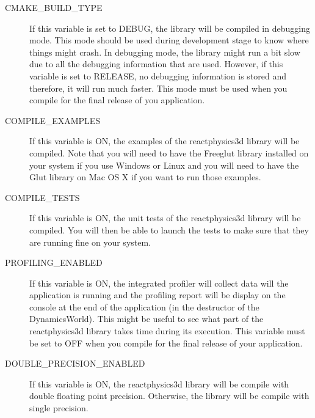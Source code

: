 \documentclass[a4paper,12pt]{article}
\begin{document}
       \begin{description}
         \item[CMAKE\_BUILD\_TYPE] If this variable is set to DEBUG, the library will be compiled in debugging mode.
                                                    This mode should be used during development stage to know where things might crash.
                                                    In debugging mode, the library might run a bit slow due to all the debugging information
                                                    that are used. However, if this variable is set to RELEASE, no debugging information is stored
                                                    and therefore, it will run much faster. This mode must be used when you compile for the final
                                                    release of you application.
                                                   
         \item[COMPILE\_EXAMPLES] If this variable is ON, the examples of the reactphysics3d library will be compiled.
                                                    Note that you will need to have the Freeglut library installed on your system if you use
                                                    Windows or Linux and you will need to have the Glut library on Mac OS X if you want to
                                                    run those examples.

         \item[COMPILE\_TESTS] If this variable is ON, the unit tests of the reactphysics3d library will be compiled. You will then
                                             be able to launch the tests to make sure that they are running fine on your system.

          \item[PROFILING\_ENABLED] If this variable is ON, the integrated profiler will collect data will the application is running
                                                      and the profiling report will be display on the console at the end of the application (in the
                                                      destructor of the DynamicsWorld). This might be useful to see what part of the reactphysics3d
                                                      library takes time during its execution. This variable must be set to OFF when you compile
                                                      for the final release of your application.

          \item[DOUBLE\_PRECISION\_ENABLED] If this variable is ON, the reactphysics3d library will be compile with double floating point precision.
                                                                    Otherwise, the library will be compile with single precision.
       \end{description}
       
\end{document}
